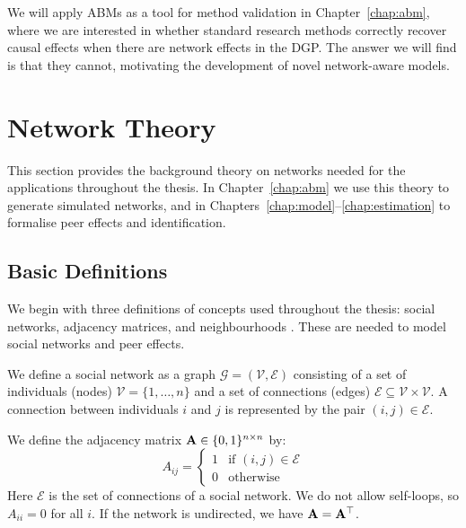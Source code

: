 We will apply ABMs as a tool for method validation in Chapter~\ref{chap:abm}, where we are interested in whether standard research methods correctly recover causal effects when there are network effects in the DGP\@. The answer we will find is that they cannot, motivating the development of novel network-aware models.

\section{Network Theory}
\label{sec:bg:networks}
This section provides the background theory on networks needed for the applications throughout the thesis. In Chapter~\ref{chap:abm} we use this theory to generate simulated networks, and in Chapters~\ref{chap:model}--\ref{chap:estimation} to formalise peer effects and identification.

\subsection{Basic Definitions}

We begin with three definitions of concepts used throughout the thesis: social networks, adjacency matrices, and neighbourhoods \parencite[see][for a comprehensive treatment]{Jackson2008}. These are needed to model social networks and peer effects.

\begin{definition}
We define a social network as a graph $\mathcal{G} = (\mathcal{V}, \mathcal{E})$ consisting of a set of individuals (nodes) $\mathcal{V} = \{1, \ldots, n\}$ and a set of connections (edges) $\mathcal{E} \subseteq \mathcal{V} \times \mathcal{V}$. A connection between individuals $i$ and $j$ is represented by the pair $(i, j) \in \mathcal{E}$.
\end{definition}

\begin{definition}
We define the adjacency matrix $\mathbf{A} \in \{0,1\}^{n \times n}$ by:
\begin{equation}
    A_{ij} = \begin{cases}
        1 & \text{if } (i,j) \in \mathcal{E} \\
        0 & \text{otherwise}
    \end{cases}
\end{equation}
Here $\mathcal{E}$ is the set of connections of a social network. We do not allow self-loops, so $A_{ii} = 0$ for all $i$. If the network is undirected, we have $\mathbf{A} = \mathbf{A}^\top$.
\end{definition}

